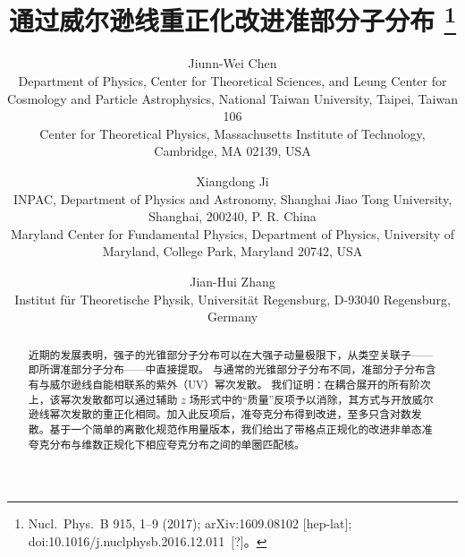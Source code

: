 \documentclass[11pt]{ctexart}
\title{通过威尔逊线重正化改进准部分子分布%
\thanks{Nucl.\ Phys.\ B 915, 1--9 (2017); arXiv:1609.08102 [hep-lat]; doi:10.1016/j.nuclphysb.2016.12.011~[?]。}}
\author{
Jiunn-Wei Chen\\[2pt]
{\small Department of Physics, Center for Theoretical Sciences, and Leung Center for Cosmology and Particle Astrophysics, National Taiwan University, Taipei, Taiwan 106}\\[2pt]
{\small Center for Theoretical Physics, Massachusetts Institute of Technology, Cambridge, MA 02139, USA}
\and
Xiangdong Ji\\[2pt]
{\small INPAC, Department of Physics and Astronomy, Shanghai Jiao Tong University, Shanghai, 200240, P. R. China}\\[2pt]
{\small Maryland Center for Fundamental Physics, Department of Physics, University of Maryland, College Park, Maryland 20742, USA}
\and
Jian-Hui Zhang\\[2pt]
{\small Institut f\"ur Theoretische Physik, Universit\"at Regensburg, D-93040 Regensburg, Germany}
}
\date{}
\begin{document}
\maketitle

\begin{abstract}
近期的发展表明，强子的光锥部分子分布可以在大强子动量极限下，从类空关联子——即所谓准部分子分布——中直接提取。
与通常的光锥部分子分布不同，准部分子分布含有与威尔逊线自能相联系的紫外（UV）幂次发散。
我们证明：在耦合展开的所有阶次上，该幂次发散都可以通过辅助 $z$ 场形式中的“质量”反项予以消除，其方式与开放威尔逊线幂次发散的重正化相同。加入此反项后，准夸克分布得到改进，至多只含对数发散。基于一个简单的离散化规范作用量版本，我们给出了带格点正规化的改进非单态准夸克分布与维数正规化下相应夸克分布之间的单圈匹配核。
\end{abstract}






\end{document}

